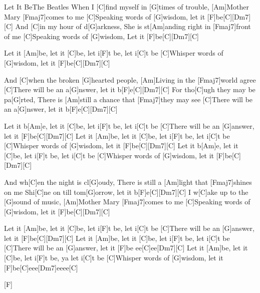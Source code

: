 \documentclass[../main.tex]{subfiles}
\begin{document}
\begin{song}{Let It Be}{The Beatles}{}
When I [C]find myself in [G]times of trouble, [Am]Mother Mary [Fmaj7]comes to me
[C]Speaking words of [G]wisdom, let it [F]be[C]{\hh}[Dm7]{\hh}[C]{\hh}
And [C]in my hour of d[G]arkness, She is st[Am]anding right in [Fmaj7]front of me
[C]Speaking words of [G]wisdom, Let it [F]be[C]{\hh}[Dm7]{\hh}[C]{\hh}

Let it [Am]be, let it [C]be,  let i[F]t be, let i[C]t be
[C]Whisper words of [G]wisdom, let it [F]be[C]{\hh}[Dm7]{\hh}[C]{\hh}

And [C]when the broken [G]hearted people, [Am]Living in the [Fmaj7]world agree
[C]There will be an a[G]nswer, let it b[F]e[C]{\hh}[Dm7]{\hh}[C]{\hh}
For tho[C]ugh they may be pa[G]rted, There is [Am]still a chance that [Fmaj7]they may see
[C]There will be an a[G]nswer, let it b[F]e[C]{\hh}[Dm7]{\hh}[C]{\hh}

Let it b[Am]e, let it [C]be, let i[F]t be, let i[C]t be
[C]There will be an [G]answer, let it [F]be[C]{\hh}[Dm7]{\hh}[C]{\hh}
Let it [Am]be, let it [C]be, let i[F]t be, let i[C]t be
[C]Whisper words of [G]wisdom, let it [F]be[C]{\hh}[Dm7]{\hh}[C]{\hh}
Let it b[Am]e, let it [C]be,  let i[F]t be, let i[C]t be
[C]Whisper words of [G]wisdom, let it [F]be[C]{\hh}[Dm7]{\hh}[C]{\hh}

And wh[C]en the night is cl[G]oudy,
There is still a [Am]light that [Fmaj7]shines on me
Shi[C]ne on till tom[G]orrow, let it b[F]e[C]{\hh}[Dm7]{\hh}[C]{\hh}
I w[C]ake up to the [G]sound of music, [Am]Mother Mary [Fmaj7]comes to me
[C]Speaking words of [G]wisdom, let it [F]be[C]{\hh}[Dm7]{\hh}[C]{\hh}

Let it [Am]be, let it [C]be,  let i[F]t be, let i[C]t be
[C]There will be an [G]answer, let it [F]be[C]{\hh}[Dm7]{\hh}[C]{\hh}
Let it [Am]be, let it [C]be,  let i[F]t be, let i[C]t be
[C]There will be an [G]answer, let it [F]be ee[C]ee[Dm7]{\hh}[C]{\hh}
Let it [Am]be, let it [C]be,  let i[F]t be, ya let i[C]t be
[C]Whisper words of [G]wisdom, let it [F]be[C]eee[Dm7]eeee[C]{\hh}

[F] \hh [C] \hh [Dm7] \hh [C] \hh
\end{song}
\end{document}
